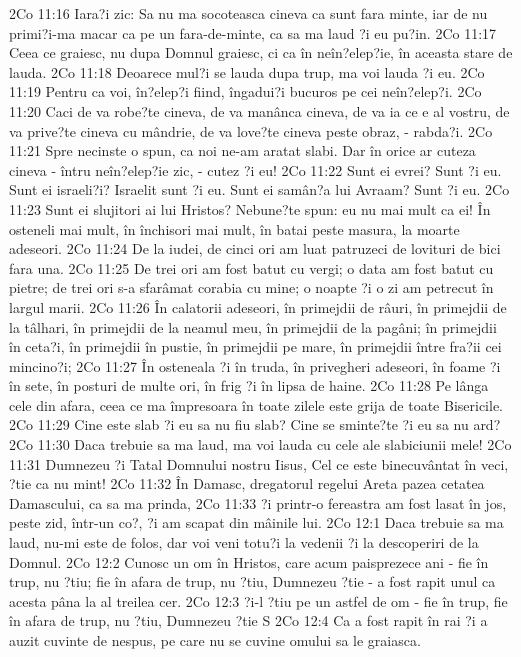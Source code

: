 2Co 11:16  Iara?i zic: Sa nu ma socoteasca cineva ca sunt fara minte, iar de nu primi?i-ma macar ca pe un fara-de-minte, ca sa ma laud ?i eu pu?in.
2Co 11:17  Ceea ce graiesc, nu dupa Domnul graiesc, ci ca în neîn?elep?ie, în aceasta stare de lauda.
2Co 11:18  Deoarece mul?i se lauda dupa trup, ma voi lauda ?i eu.
2Co 11:19  Pentru ca voi, în?elep?i fiind, îngadui?i bucuros pe cei neîn?elep?i.
2Co 11:20  Caci de va robe?te cineva, de va manânca cineva, de va ia ce e al vostru, de va prive?te cineva cu mândrie, de va love?te cineva peste obraz, - rabda?i.
2Co 11:21  Spre necinste o spun, ca noi ne-am aratat slabi. Dar în orice ar cuteza cineva - întru neîn?elep?ie zic, - cutez ?i eu!
2Co 11:22  Sunt ei evrei? Sunt ?i eu. Sunt ei israeli?i? Israelit sunt ?i eu. Sunt ei samân?a lui Avraam? Sunt ?i eu.
2Co 11:23  Sunt ei slujitori ai lui Hristos? Nebune?te spun: eu nu mai mult ca ei! În osteneli mai mult, în închisori mai mult, în batai peste masura, la moarte adeseori.
2Co 11:24  De la iudei, de cinci ori am luat patruzeci de lovituri de bici fara una.
2Co 11:25  De trei ori am fost batut cu vergi; o data am fost batut cu pietre; de trei ori s-a sfarâmat corabia cu mine; o noapte ?i o zi am petrecut în largul marii.
2Co 11:26  În calatorii adeseori, în primejdii de râuri, în primejdii de la tâlhari, în primejdii de la neamul meu, în primejdii de la pagâni; în primejdii în ceta?i, în primejdii în pustie, în primejdii pe mare, în primejdii între fra?ii cei mincino?i;
2Co 11:27  În osteneala ?i în truda, în privegheri adeseori, în foame ?i în sete, în posturi de multe ori, în frig ?i în lipsa de haine.
2Co 11:28  Pe lânga cele din afara, ceea ce ma împresoara în toate zilele este grija de toate Bisericile.
2Co 11:29  Cine este slab ?i eu sa nu fiu slab? Cine se sminte?te ?i eu sa nu ard?
2Co 11:30  Daca trebuie sa ma laud, ma voi lauda cu cele ale slabiciunii mele!
2Co 11:31  Dumnezeu ?i Tatal Domnului nostru Iisus, Cel ce este binecuvântat în veci, ?tie ca nu mint!
2Co 11:32  În Damasc, dregatorul regelui Areta pazea cetatea Damascului, ca sa ma prinda,
2Co 11:33  ?i printr-o fereastra am fost lasat în jos, peste zid, într-un co?, ?i am scapat din mâinile lui.
2Co 12:1  Daca trebuie sa ma laud, nu-mi este de folos, dar voi veni totu?i la vedenii ?i la descoperiri de la Domnul.
2Co 12:2  Cunosc un om în Hristos, care acum paisprezece ani - fie în trup, nu ?tiu; fie în afara de trup, nu ?tiu, Dumnezeu ?tie - a fost rapit unul ca acesta pâna la al treilea cer.
2Co 12:3  ?i-l ?tiu pe un astfel de om - fie în trup, fie în afara de trup, nu ?tiu, Dumnezeu ?tie S
2Co 12:4  Ca a fost rapit în rai ?i a auzit cuvinte de nespus, pe care nu se cuvine omului sa le graiasca.
